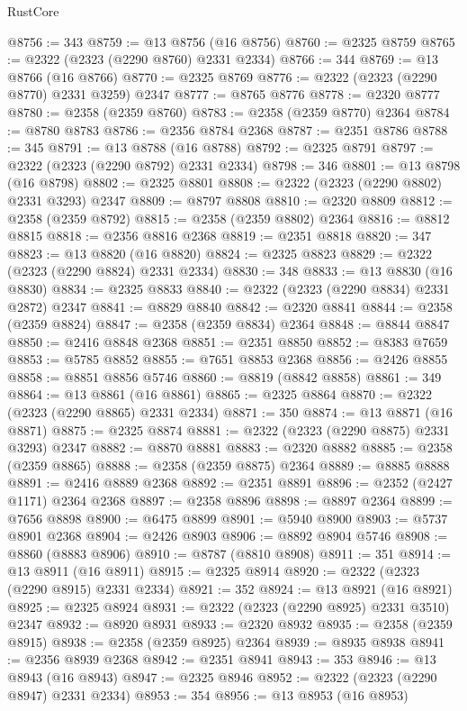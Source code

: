 \begin{lexlean}{RustCore}
\begin{coremodule}
@8756 := 343
@8759 := @13 @8756 (@16 @8756)
@8760 := @2325 @8759
@8765 := @2322 (@2323 (@2290 @8760) @2331 @2334)
@8766 := 344
@8769 := @13 @8766 (@16 @8766)
@8770 := @2325 @8769
@8776 := @2322 (@2323 (@2290 @8770) @2331 @3259) @2347
@8777 := @8765 @8776
@8778 := @2320 @8777
@8780 := @2358 (@2359 @8760)
@8783 := @2358 (@2359 @8770) @2364
@8784 := @8780 @8783
@8786 := @2356 @8784 @2368
@8787 := @2351 @8786
@8788 := 345
@8791 := @13 @8788 (@16 @8788)
@8792 := @2325 @8791
@8797 := @2322 (@2323 (@2290 @8792) @2331 @2334)
@8798 := 346
@8801 := @13 @8798 (@16 @8798)
@8802 := @2325 @8801
@8808 := @2322 (@2323 (@2290 @8802) @2331 @3293) @2347
@8809 := @8797 @8808
@8810 := @2320 @8809
@8812 := @2358 (@2359 @8792)
@8815 := @2358 (@2359 @8802) @2364
@8816 := @8812 @8815
@8818 := @2356 @8816 @2368
@8819 := @2351 @8818
@8820 := 347
@8823 := @13 @8820 (@16 @8820)
@8824 := @2325 @8823
@8829 := @2322 (@2323 (@2290 @8824) @2331 @2334)
@8830 := 348
@8833 := @13 @8830 (@16 @8830)
@8834 := @2325 @8833
@8840 := @2322 (@2323 (@2290 @8834) @2331 @2872) @2347
@8841 := @8829 @8840
@8842 := @2320 @8841
@8844 := @2358 (@2359 @8824)
@8847 := @2358 (@2359 @8834) @2364
@8848 := @8844 @8847
@8850 := @2416 @8848 @2368
@8851 := @2351 @8850
@8852 := @8383 @7659
@8853 := @5785 @8852
@8855 := @7651 @8853 @2368
@8856 := @2426 @8855
@8858 := @8851 @8856 @5746
@8860 := @8819 (@8842 @8858)
@8861 := 349
@8864 := @13 @8861 (@16 @8861)
@8865 := @2325 @8864
@8870 := @2322 (@2323 (@2290 @8865) @2331 @2334)
@8871 := 350
@8874 := @13 @8871 (@16 @8871)
@8875 := @2325 @8874
@8881 := @2322 (@2323 (@2290 @8875) @2331 @3293) @2347
@8882 := @8870 @8881
@8883 := @2320 @8882
@8885 := @2358 (@2359 @8865)
@8888 := @2358 (@2359 @8875) @2364
@8889 := @8885 @8888
@8891 := @2416 @8889 @2368
@8892 := @2351 @8891
@8896 := @2352 (@2427 @1171) @2364 @2368
@8897 := @2358 @8896
@8898 := @8897 @2364
@8899 := @7656 @8898
@8900 := @6475 @8899
@8901 := @5940 @8900
@8903 := @5737 @8901 @2368
@8904 := @2426 @8903
@8906 := @8892 @8904 @5746
@8908 := @8860 (@8883 @8906)
@8910 := @8787 (@8810 @8908)
@8911 := 351
@8914 := @13 @8911 (@16 @8911)
@8915 := @2325 @8914
@8920 := @2322 (@2323 (@2290 @8915) @2331 @2334)
@8921 := 352
@8924 := @13 @8921 (@16 @8921)
@8925 := @2325 @8924
@8931 := @2322 (@2323 (@2290 @8925) @2331 @3510) @2347
@8932 := @8920 @8931
@8933 := @2320 @8932
@8935 := @2358 (@2359 @8915)
@8938 := @2358 (@2359 @8925) @2364
@8939 := @8935 @8938
@8941 := @2356 @8939 @2368
@8942 := @2351 @8941
@8943 := 353
@8946 := @13 @8943 (@16 @8943)
@8947 := @2325 @8946
@8952 := @2322 (@2323 (@2290 @8947) @2331 @2334)
@8953 := 354
@8956 := @13 @8953 (@16 @8953)

\end{coremodule}
\end{lexlean}
